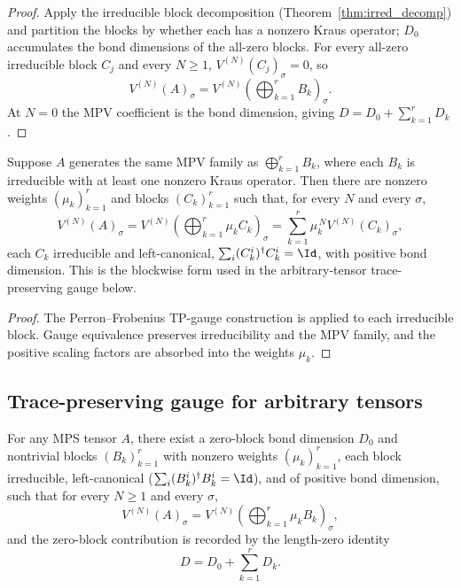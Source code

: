 \begin{proof}\leanok
    Apply the irreducible block decomposition (Theorem~\ref{thm:irred_decomp})
    and partition the blocks by whether each has a nonzero Kraus operator; $D_0$
    accumulates the bond dimensions of the all-zero blocks. For every all-zero
    irreducible block $C_j$ and every $N \ge 1$, $V^{(N)}(C_j)_\sigma = 0$, so
    \[
        V^{(N)}(A)_\sigma
        = V^{(N)}\!(\textstyle\bigoplus_{k=1}^r B_k)_\sigma.
    \]
    At $N = 0$ the MPV coefficient is the bond dimension, giving
    $D = D_0 + \sum_{k=1}^r D_k$.
\end{proof}

\begin{theorem}%
    \label{thm:blockwise_tp_gauge}
    \leanok
    Suppose $A$ generates the same MPV family as $\bigoplus_{k=1}^r B_k$, where
    each $B_k$ is irreducible with at least one nonzero Kraus operator. Then there
    are nonzero weights $(\mu_k)_{k=1}^r$ and blocks $(C_k)_{k=1}^r$ such that, for
    every $N$ and every $\sigma$,
    \[
        V^{(N)}(A)_\sigma
        =
        V^{(N)}\!(\textstyle\bigoplus_{k=1}^r \mu_k C_k)_\sigma
        =
        \sum_{k=1}^r \mu_k^{\,N} V^{(N)}(C_k)_\sigma,
    \]
    each $C_k$ irreducible and left-canonical,
    $\sum_i (C_k^i)^\dagger C_k^i = \Id$, with positive bond dimension. This is
    the blockwise form used in the arbitrary-tensor trace-preserving gauge
    below.
\end{theorem}

\begin{proof}\leanok
    The Perron--Frobenius TP-gauge construction is applied to each irreducible
    block. Gauge equivalence preserves irreducibility and the MPV family, and the
    positive scaling factors are absorbed into the weights $\mu_k$.
\end{proof}

\subsection{Trace-preserving gauge for arbitrary tensors}%
\label{sec:tp_gauge_arbitrary}

\begin{theorem}%
    \label{thm:tp_gauge_arbitrary}
    \leanok
    For any MPS tensor $A$, there exist a zero-block bond dimension $D_0$ and
    nontrivial blocks $(B_k)_{k=1}^r$ with nonzero weights $(\mu_k)_{k=1}^r$,
    each block irreducible, left-canonical
    ($\sum_i (B_k^i)^\dagger B_k^i = \Id$), and of positive bond dimension, such
    that for every $N \ge 1$ and every $\sigma$,
    \[
        V^{(N)}(A)_\sigma
        = V^{(N)}\!(\textstyle\bigoplus_{k=1}^r \mu_k B_k)_\sigma,
    \]
    and the zero-block contribution is recorded by the length-zero identity
    \[
        D = D_0 + \sum_{k=1}^r D_k.
    \]
\end{theorem}

